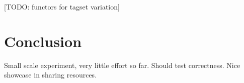 \documentclass[10pt,a4paper]{article}
\begin{document}
[TODO: functors for tagset variation]

\section{Conclusion}

Small scale experiment, very little effort so far. 
Should test correctness.
Nice showcase in sharing resources.




\end{document}
